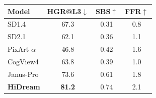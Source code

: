\begin{tabular}{lccc}
\toprule
\textbf{Model}
& \textbf{HGR@L3}$\downarrow$
& \textbf{SBS}$\uparrow$
& \textbf{FFR}$\uparrow$ \\
\midrule
SD1.4           & 67.3 & 0.31 & 0.8 \\
SD2.1           & 62.1 & 0.36 & 1.1 \\
\rowcolor{gray!20}
PixArt-$\alpha$ & \cellcolor{gray!20}46.8 & 0.42 & 1.6 \\
CogView4        & 63.8 & 0.39 & 1.0 \\
Janus-Pro       & 73.6 & 0.61 & 1.8 \\
\textbf{HiDream}& \textbf{81.2} & 0.74 & 2.1 \\
\bottomrule
\end{tabular}
